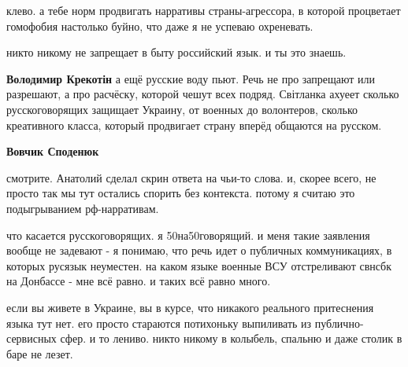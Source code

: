 \begin{itemize}
 

клево. а тебе норм продвигать нарративы страны-агрессора, в которой процветает
гомофобия настолько буйно, что даже я не успеваю охреневать.

никто никому не запрещает в быту российский язык. и ты это знаешь.

\begin{itemize}
 
\textbf{Володимир Крекотін} а ещё русские воду пьют.
Речь не про запрещают или разрешают, а про расчёску, которой чешут всех подряд. Світланка ахуеет сколько русскоговорящих защищает Украину, от военных до волонтеров, сколько креативного класса, который продвигает страну вперёд общаются на русском.

 
\textbf{Вовчик Споденюк} 

смотрите. Анатолий сделал скрин ответа на чьи-то слова. и, скорее всего, не
просто так мы тут остались спорить без контекста. потому я считаю это
подыгрыванием рф-нарративам.

что касается русскоговорящих. я 50на50говорящий. и меня такие заявления вообще
не задевают - я понимаю, что речь идет о публичных коммуникациях, в которых
русязык неуместен. на каком языке военные ВСУ отстреливают свнсбк на Донбассе -
мне всё равно. и таких всё равно много.

если вы живете в Украине, вы в курсе, что никакого реального притеснения языка
тут нет. его просто стараются потихоньку выпиливать из публично-сервисных сфер.
и то лениво. никто никому в колыбель, спальню и даже столик в баре не лезет.

 

\end{itemize}
\end{itemize}
